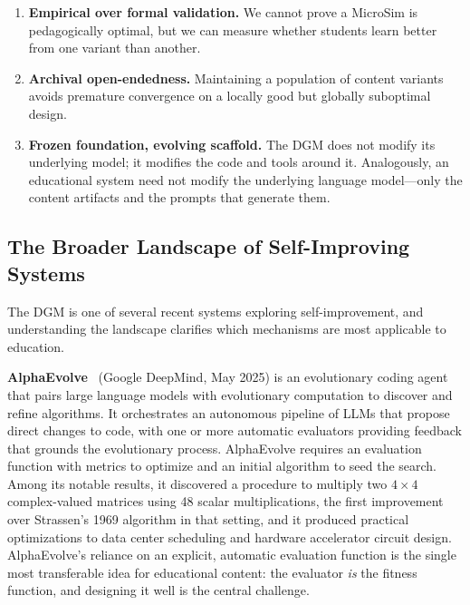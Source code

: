 \begin{enumerate}
    \item \textbf{Empirical over formal validation.} We cannot prove a MicroSim
          is pedagogically optimal, but we can measure whether students learn
          better from one variant than another.
    \item \textbf{Archival open-endedness.} Maintaining a population of content
          variants avoids premature convergence on a locally good but globally
          suboptimal design.
    \item \textbf{Frozen foundation, evolving scaffold.} The DGM does not
          modify its underlying model; it modifies the code and tools around it.
          Analogously, an educational system need not modify the underlying
          language model---only the content artifacts and the prompts that
          generate them.
\end{enumerate}

\subsection{The Broader Landscape of Self-Improving Systems}

The DGM is one of several recent systems exploring self-improvement, and
understanding the landscape clarifies which mechanisms are most applicable to
education.

\textbf{AlphaEvolve}~\cite{novikov2025alphaevolve} (Google DeepMind, May 2025)
is an evolutionary coding agent that pairs large language models with
evolutionary computation to discover and refine algorithms. It orchestrates an
autonomous pipeline of LLMs that propose direct changes to code, with one or
more automatic evaluators providing feedback that grounds the evolutionary
process. AlphaEvolve requires an evaluation function with metrics to optimize
and an initial algorithm to seed the search. Among its notable results, it
discovered a procedure to multiply two $4 \times 4$ complex-valued matrices
using 48 scalar multiplications, the first improvement over Strassen's 1969
algorithm in that setting, and it produced practical optimizations to data
center scheduling and hardware accelerator circuit design. AlphaEvolve's
reliance on an explicit, automatic evaluation function is the single most
transferable idea for educational content: the evaluator \textit{is} the
fitness function, and designing it well is the central challenge.

